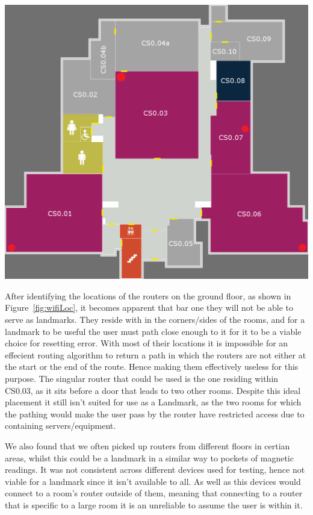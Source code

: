 \documentclass[12pt,a4paper]{report}
\begin{document}
\begin{center}
\includegraphics[scale=0.3]{images-implementation/wifiLocation.png}
\label{fig:wifiLoc}
\end{center}

After identifying the locations of the routers on the ground floor, as shown in Figure~\ref{fig:wifiLoc}, it becomes apparent that bar one they will not be able to serve as landmarks. They reside with in the corners/sides of the rooms, and for a landmark to be useful the user must path close enough to it for it to be a viable choice for resetting error. With most of their locations it is impossible for an effecient routing algorithm to return a path in which the routers are not either at the start or the end of the route. Hence making them effectively useless for this purpose. The singular router that could be used is the one residing within CS0.03, as it sits before a door that leads to two other rooms. Despite this ideal placement it still isn't suited for use as a Landmark, as the two rooms for which the pathing would make the user pass by the router have restricted access due to containing servers/equipment.

We also found that we often picked up routers from different floors in certian areas, whilst this could be a landmark in a similar way to pockets of magnetic readings. It was not consistent across different devices used for testing, hence not viable for a landmark since it isn't available to all. As well as this devices would connect to a room's router outside of them, meaning that connecting to a router that is specific to a large room it is an unreliable to assume the user is within it.
\end{document}
